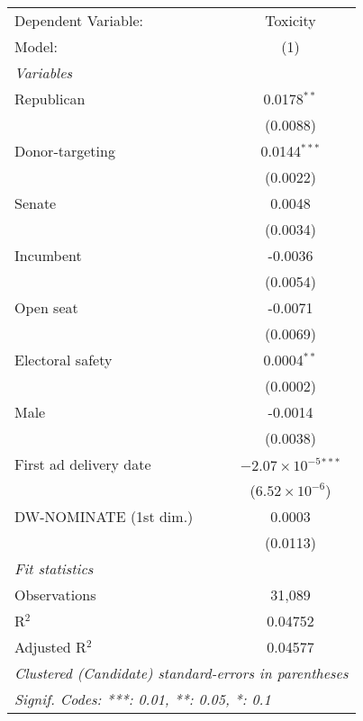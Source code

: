 
\begingroup
\centering
\begin{tabular}{lc}
   \tabularnewline \midrule \midrule
   Dependent Variable:    & Toxicity\\  
   Model:                 & (1)\\  
   \midrule
   \emph{Variables}\\
   Republican             & 0.0178$^{**}$\\   
                          & (0.0088)\\   
   Donor-targeting        & 0.0144$^{***}$\\   
                          & (0.0022)\\   
   Senate                 & 0.0048\\   
                          & (0.0034)\\   
   Incumbent              & -0.0036\\   
                          & (0.0054)\\   
   Open seat              & -0.0071\\   
                          & (0.0069)\\   
   Electoral safety       & 0.0004$^{**}$\\   
                          & (0.0002)\\   
   Male                   & -0.0014\\   
                          & (0.0038)\\   
   First ad delivery date & $-2.07\times 10^{-5}$$^{***}$\\    
                          & ($6.52\times 10^{-6}$)\\    
   DW-NOMINATE (1st dim.) & 0.0003\\   
                          & (0.0113)\\   
   \midrule
   \emph{Fit statistics}\\
   Observations           & 31,089\\  
   R$^2$                  & 0.04752\\  
   Adjusted R$^2$         & 0.04577\\  
   \midrule \midrule
   \multicolumn{2}{l}{\emph{Clustered (Candidate) standard-errors in parentheses}}\\
   \multicolumn{2}{l}{\emph{Signif. Codes: ***: 0.01, **: 0.05, *: 0.1}}\\
\end{tabular}
\par\endgroup


